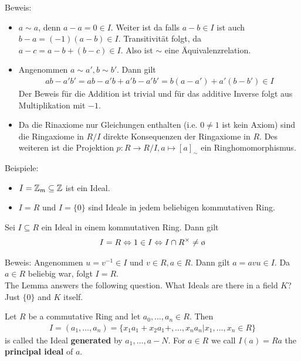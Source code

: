 Beweis:
\begin{itemize}
				\item 	$a \sim a$, denn $a-a = 0 \in I$. Weiter ist da falls $a-b \in I$ ist auch $b-a = (-1)(a-b) \in I$. Transitivität folgt, da $a-c = a-b + (b-c) \in I$. Also ist $\sim$ eine Äquivalenzrelation.
\item Angenommen $a \sim a', b \sim b'$. Dann gilt
				\begin{align*}
								ab - a'b' = ab - a'b + a'b - a'b' = b(a-a') + a'(b - b') \in I
				\end{align*}
				Der Beweis für die Addition ist trivial und für das additive Inverse folgt aus Multiplikation mit $-1$.
\item Da die Rinaxiome nur Gleichungen enthalten (i.e. $0 \neq 1$ ist kein Axiom) sind die Ringaxiome in $R/I$ direkte Konsequenzen der Ringaxiome in $R$. Des weiteren ist die Projektion $p: R \to R/I, a \mapsto [a]_{\sim}$ ein Ringhomomorphismus.
\end{itemize}



Beispiele:
\begin{itemize}
\item $I = \mathbb{Z}_m \subseteq \mathbb{Z}$ ist ein Ideal.
\item $I = R$ und $I = \{0\}$ sind Ideale in jedem beliebigen kommutativen Ring.
\end{itemize}



\begin{lemma}[]
Sei $I \subseteq R$ ein Ideal in einem kommutativen Ring. Dann gilt
\begin{align*}
I = R \Leftrightarrow 1 \in I \Leftrightarrow I \cap R^\times \neq \es
\end{align*}
\end{lemma}

Beweis: \quad Angenommen $u = v^{-1} \in I$ und $v \in R, a \in R$. Dann gilt $a = avu \in I$. Da $a \in R$ beliebig war, folgt $I = R$.\\


The Lemma answers the following question. What Ideals are there in a field $K$? Just $\{0\}$ and $K$ itself.


\begin{definition}[]
Let $R$ be a commutative Ring and let $a_0, \ldots, a_n \in R$. Then
\begin{align*}
				I = (a_1, \ldots, a_n) = \{x_1 a_1 + x_2 a_1 +, \ldots, x_n a_n \big\vert x_1, \ldots, x_n \in R\} 
\end{align*}
is called  the Ideal \textbf{generated}  by $a_1, \ldots, a-N$. For $a \in R$ we call $I(a) = Ra$ the \textbf{principal ideal} of $a$.
\end{definition}


